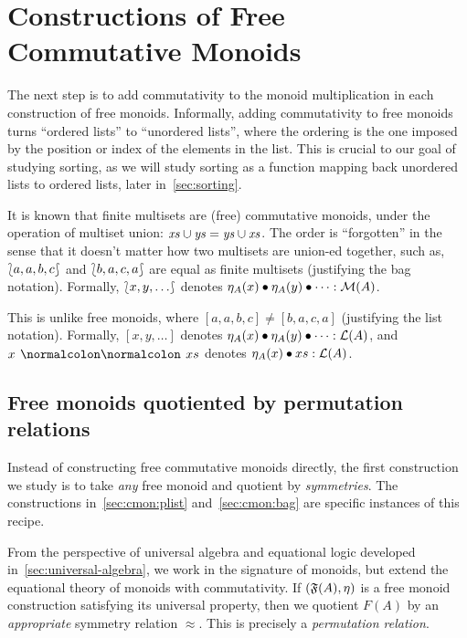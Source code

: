 
\section{Constructions of Free Commutative Monoids}
\label{sec:commutative-monoids}

The next step is to add commutativity to the monoid multiplication in each construction of free monoids.
%
Informally, adding commutativity to free monoids turns ``ordered lists'' to ``unordered lists'',
where the ordering is the one imposed by the position or index of the elements in the list.
%
This is crucial to our goal of studying sorting,
as we will study sorting as a function mapping back unordered lists to ordered lists,
later in~\cref{sec:sorting}.

It is known that finite multisets are (free) commutative monoids,
under the operation of multiset union: $\mathit{xs} \cup \mathit{ys} = \mathit{ys} \cup \mathit{xs}$.
%
The order is ``forgotten'' in the sense that it doesn't matter how two multisets are union-ed together,
such as, ${\lbag}{a, a, b, c}{\rbag}$ and ${\lbag}{b, a, c, a}{\rbag}$ are equal as finite multisets
(justifying the bag notation).
Formally, ${\lbag}{x,y,\dots}{\rbag}$ denotes $\eta_A(x) \mathbin{\bullet} \eta_A(y) \mathbin{\bullet} \dots : \mathcal{M}(A)$.

%
This is unlike free monoids,
where $[a, a, b, c] \neq [b, a, c, a]$ (justifying the list notation).
Formally, $[x, y, \dots]$ denotes $\eta_A(x) \mathbin{\bullet} \eta_A(y) \mathbin{\bullet} \dots : \mathcal{L}(A)$,
and $x \cons xs$ denotes $\eta_A(x) \mathbin{\bullet} xs : \mathcal{L}(A)$.

\subsection{Free monoids quotiented by permutation relations}
\label{sec:cmon:qfreemon}

Instead of constructing free commutative monoids directly,
the first construction we study is to take \emph{any} free monoid and quotient by \emph{symmetries}.
%
The constructions in~\cref{sec:cmon:plist} and~\cref{sec:cmon:bag} are specific instances of this recipe.

From the perspective of universal algebra and equational logic developed in~\cref{sec:universal-algebra},
we work in the signature of monoids, but extend the equational theory of monoids with commutativity.
%
If $(\mathfrak{F}(A), \eta)$ is a free monoid construction satisfying its universal property,
then we quotient $F(A)$ by an \emph{appropriate} symmetry relation $\approx$.
%
This is precisely a \emph{permutation relation}.

